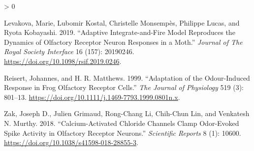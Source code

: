 \documentclass[
]{article}
\newlength{\cslhangindent}
\newenvironment{CSLReferences}[2] %
 {%
  \setlength{\parindent}{0pt}
  \ifodd #1 \everypar{\setlength{\hangindent}{\cslhangindent}}\ignorespaces\fi
  \ifnum #2 > 0
  \setlength{\parskip}{#2\baselineskip}
  \fi
 }%
 {}
\begin{document}
\begin{CSLReferences}{1}{0}
\leavevmode\hypertarget{ref-levakova19adaptive}{}%
Levakova, Marie, Lubomir Kostal, Christelle Monsempès, Philippe Lucas, and Ryota Kobayashi. 2019. {``Adaptive Integrate-and-Fire Model Reproduces the Dynamics of Olfactory Receptor Neuron Responses in a Moth.''} \emph{Journal of The Royal Society Interface} 16 (157): 20190246. \url{https://doi.org/10.1098/rsif.2019.0246}.

\leavevmode\hypertarget{ref-reisert99adaptation}{}%
Reisert, Johannes, and H. R. Matthews. 1999. {``Adaptation of the Odour-Induced Response in Frog Olfactory Receptor Cells.''} \emph{The Journal of Physiology} 519 (3): 801--13. \url{https://doi.org/10.1111/j.1469-7793.1999.0801n.x}.

\leavevmode\hypertarget{ref-zak18calciumactivated}{}%
Zak, Joseph D., Julien Grimaud, Rong-Chang Li, Chih-Chun Lin, and Venkatesh N. Murthy. 2018. {``Calcium-Activated Chloride Channels Clamp Odor-Evoked Spike Activity in Olfactory Receptor Neurons.''} \emph{Scientific Reports} 8 (1): 10600. \url{https://doi.org/10.1038/s41598-018-28855-3}.

\end{CSLReferences}
\end{document}
